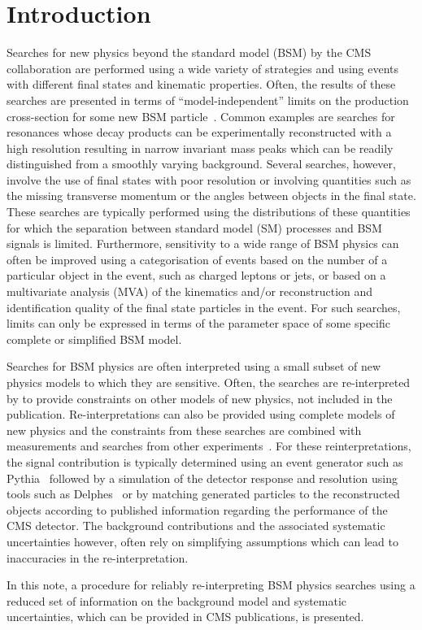 \section{Introduction}
\label{sec:intro}

Searches for new physics beyond the standard model (BSM) by the CMS collaboration are performed using a wide variety of 
strategies and using events with different final states and kinematic properties.  Often, 
the results of these searches are presented in terms of ``model-independent'' limits on the production 
cross-section for some new BSM particle~\cite{Aaboud:2016tru,Khachatryan:2016yec}. Common examples are searches for resonances whose decay products 
can be experimentally reconstructed with a high resolution resulting in narrow invariant mass peaks which can be readily distinguished from 
a smoothly varying background. Several searches, however, involve the use of final states with poor resolution or involving 
quantities such as the missing transverse momentum or the angles between objects in the final state. These searches are typically performed using the 
distributions of these quantities for which the separation between standard model (SM) processes and BSM signals is limited. Furthermore, 
sensitivity to a wide range of BSM physics can often be improved using a categorisation of events based on the number of a particular 
object in the event, such as charged leptons or jets, or based on a multivariate analysis (MVA) of the kinematics and/or reconstruction and 
identification quality of the final state particles in the event. For such searches, limits can only be expressed in terms of the 
parameter space of some specific complete or simplified BSM model.

Searches for BSM physics are often interpreted using a small subset of new physics 
models to which they are sensitive. Often, the searches are re-interpreted by 
to provide constraints on other models of new physics, not included in the publication.
Re-interpretations can also be provided using complete models of new physics and the constraints from 
these searches are combined with measurements and searches from other experiments~\cite{mastercode}. 
For these reinterpretations, the signal contribution is typically determined using an event generator 
such as {\sc Pythia}~\cite{pythia} followed by a simulation of the detector 
response and resolution using tools such as {\sc Delphes}~\cite{delphes} or by matching generated particles to
the reconstructed objects according to published information regarding the performance of the CMS detector. 
The background contributions and the associated systematic uncertainties however, often rely
on simplifying assumptions which can lead to inaccuracies in the re-interpretation. 

In this note, a procedure for reliably re-interpreting BSM physics searches using a reduced set of information
on the background model and systematic uncertainties, which can be provided in CMS publications, is presented.



